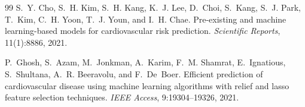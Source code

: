 \documentclass[12pt,a4paper]{article}
\begin{document}
\begin{thebibliography}{99}
S.~Y. Cho, S.~H. Kim, S.~H. Kang, K.~J. Lee, D.~Choi, S.~Kang, S.~J. Park, T.~Kim, C.~H. Yoon, T.~J. Youn, and I.~H. Chae.
\newblock Pre-existing and machine learning-based models for cardiovascular risk prediction.
\newblock \emph{Scientific Reports}, 11(1):8886, 2021.

P.~Ghosh, S.~Azam, M.~Jonkman, A.~Karim, F.~M. Shamrat, E.~Ignatious, S.~Shultana, A.~R. Beeravolu, and F.~De~Boer.
\newblock Efficient prediction of cardiovascular disease using machine learning algorithms with relief and lasso feature selection techniques.
\newblock \emph{IEEE Access}, 9:19304--19326, 2021.

\end{thebibliography}
\end{document}
